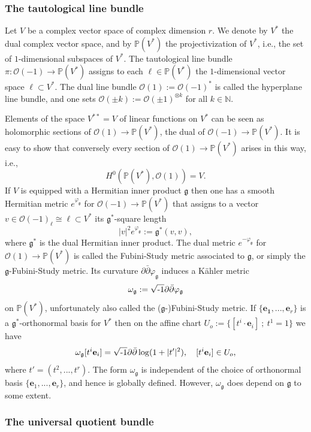 \documentclass[12pt,hidelinks]{amsart}
\newcommand{\cO}{{\mathcal O}}
\newcommand{\fg}{{\mathfrak g}}
\newcommand{\vp}{\varphi}
\newcommand{\bbN}{{\mathbb N}}
\newcommand{\bbP}{{\mathbb P}}
\newcommand{\di}{\partial}
\newcommand{\dbar}{\bar \partial}
\newcommand{\ii}{\sqrt{\text{\rm -}1}}
\newcommand{\tensor}{\otimes}
\begin{document}
\subsubsection{\sf The tautological line bundle}\label{O1-par}

Let $V$ be a complex vector space of complex dimension $r$.  We denote by $V^*$ the dual complex vector space, and by $\bbP(V^*)$ the projectivization of $V^*$, i.e., the set of $1$-dimensional subspaces of $V^*$.  The tautological line bundle $\pi : \cO (-1) \to \bbP(V^*)$ assigns to each $\ell \in \bbP(V^*)$ the $1$-dimensional vector space $\ell \subset V^*$.  The dual line bundle $\cO (1) := \cO (-1) ^*$ is called the hyperplane line bundle, and one sets $\cO (\pm k) := \cO (\pm 1) ^{\tensor k}$ for all $k \in \bbN$.

 Elements of the space $V^{**} = V$ of linear functions on $V^*$ can be seen as  holomorphic sections of $\cO (1) \to \bbP(V^*)$, the dual of $\cO (-1) \to \bbP(V^*)$.  It is easy to show that conversely every section of $\cO (1) \to \bbP(V^*)$ arises in this way, i.e.,  
 \begin{equation}\label{o1-glob-eq}
 H^0(\bbP(V^*), \cO (1)) = V.
 \end{equation}
If $V$ is equipped with a Hermitian inner product $\fg$ then one has a smooth Hermitian metric $e^{\vp _{\fg}}$ for $\cO (-1) \to \bbP(V^*)$ that assigns to a vector $v \in \cO (-1) _{\ell}\cong \ell \subset V^*$ its $\fg^*$-square length 
\[
|v|^2e^{\vp _{\fg}} := \fg^* (v,v),
\]
where $\fg ^*$ is the dual Hermitian inner product.  The dual metric $e^{-\vp_{\fg}}$ for $\cO (1) \to \bbP(V^*)$ is called the Fubini-Study metric associated to $\fg$, or simply the $\fg$-Fubini-Study metric.  Its curvature $\di \dbar \vp _{\fg}$ induces a K\"ahler metric 
\[
\omega _{\fg} := \ii \di \dbar \vp _{\fg}
\]
on $\bbP(V^*)$, unfortunately also called the ($\fg$-)Fubini-Study metric.  If $\{\mathbf{e_1}, ... , \mathbf{e}_r\}$ is a $\fg^*$-orthonormal basis for $V^*$ then on the affine chart $U_o := \{ [t^i \cdot \mathbf{e}_i]\ ;\ t^1 = 1\}$ we have 
\[
\omega _{\fg}[t^i \mathbf{e}_i] = \ii \di \dbar \log (1+ |t'|^2), \quad [t^i \mathbf{e}_i] \in U_o,
\]
where $t' = (t^2,..., t^r)$.  The form $\omega _{\fg}$ is independent of the choice of orthonormal basis $\{\mathbf{e}_1, ... , \mathbf{e}_r\}$, and hence is globally defined.  However, $\omega _{\fg}$ does depend on $\fg$ to some extent.  

\subsubsection{\sf The universal quotient bundle}\label{UQB-par}
\end{document}
